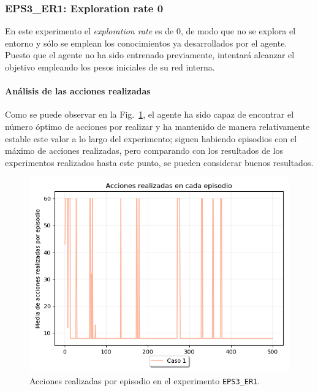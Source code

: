 \subsubsection{EPS3\_ER1: Exploration rate 0} \label{EPS3_ER1}

En este experimento el \textit{exploration rate} es de 0, de modo que no se explora el entorno y sólo se emplean los conocimientos ya desarrollados por el agente. Puesto que el agente no ha sido entrenado previamente, intentará alcanzar el objetivo empleando los pesos iniciales de su red interna. 

\paragraph{Análisis de las acciones realizadas}

Como se puede observar en la Fig.~\ref{fig:dim5_lr0.01_ep0_acciones}, el agente ha sido capaz de encontrar el número óptimo de acciones por realizar y ha mantenido de manera relativamente estable este valor a lo largo del experimento; siguen habiendo episodios con el máximo de acciones realizadas, pero comparando con los resultados de los experimentos realizados hasta este punto, se pueden considerar buenos resultados. \\

\begin{figure}
    \centering
    \includegraphics[scale=0.4]{cap5_experimentacion/images/dim5_lr0.01_ep0_acciones.png}
    \caption{Acciones realizadas por episodio en el experimento \texttt{EPS3\_ER1}.}
    \label{fig:dim5_lr0.01_ep0_acciones}
\end{figure}

